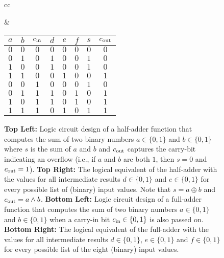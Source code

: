 \begin{figure}
\begin{tabular}{cc}
\begin{minipage}[c]{.45\linewidth}
\begin{tikzpicture}
                \draw (a) -- (HA1in1);
                \draw (b) -- (HA1in2);
                \draw (HA1out1) -- (HA2in2);
                \draw (cin) -| (HA2in1);
                \draw (HA2out2) |- (OR.in 1);
                \draw (HA1out2) |- (OR.in 2);
                \draw (HA2out1) -- (s);
            \end{tikzpicture}
        \end{minipage} &
        \begin{minipage}[c]{.5\linewidth}
            \centering
            \begin{tabular}{c|c|c||c|c|c|c|c}
                $a$ & $b$ & $c_{\mathrm{in}}$ & $d$ & $e$ & $f$ & $s$ & $c_{\mathrm{out}}$ \\
                \hline
                $0$ & $0$ & $0$    & $0$ & $0$ & $0$ & $0$ & $0$     \\
                $0$ & $1$ & $0$    & $1$ & $0$ & $0$ & $1$ & $0$     \\
                $1$ & $0$ & $0$    & $1$ & $0$ & $0$ & $1$ & $0$     \\
                $1$ & $1$ & $0$    & $0$ & $1$ & $0$ & $0$ & $1$     \\
                $0$ & $0$ & $1$    & $0$ & $0$ & $0$ & $1$ & $0$     \\
                $0$ & $1$ & $1$    & $1$ & $0$ & $1$ & $0$ & $1$     \\
                $1$ & $0$ & $1$    & $1$ & $0$ & $1$ & $0$ & $1$     \\
                $1$ & $1$ & $1$    & $0$ & $1$ & $0$ & $1$ & $1$     \\
            \end{tabular}
        \end{minipage}
    \end{tabular}
    \caption{{\bf Top Left:} Logic circuit design of a half-adder function that computes the sum of two binary numbers $a \in \{0,1\}$ and $b \in \{0,1\}$ where $s$ is the sum of $a$ and $b$ and $c_{\mathrm{out}}$ captures the carry-bit indicating an overflow (i.e., if $a$ and $b$ are both $1$, then $s=0$ and $c_{\mathrm{out}}=1$). {\bf Top Right:} The logical equivalent of the half-adder with the values for all intermediate results $d \in \{0,1\}$ and $e \in \{0,1\}$ for every possible list of (binary) input values. Note that $s = a \oplus b$ and $c_{\mathrm{out}} = a \land b$. {\bf Bottom Left:} Logic circuit design of a full-adder function that computes the sum of two binary numbers $a \in \{0,1\}$ and $b \in \{0,1\}$ when a carry-in bit $c_{\mathrm{in}} \in \{0,1\}$ is also passed on. {\bf Bottom Right:} The logical equivalent of the full-adder with the values for all intermediate results $d \in \{0,1\}$, $e \in \{0,1\}$ and $f \in \{0,1\}$ for every possible list of the eight (binary) input values. \label{fig:half-and-full-adder}}
\end{figure}

